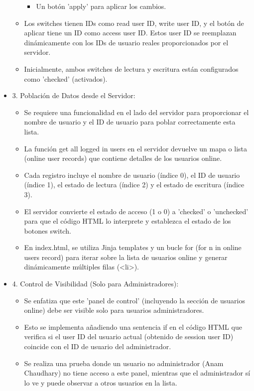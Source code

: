 \documentclass{report}
\begin{document}
\begin{itemize}
\begin{itemize}
\begin{itemize}
                    \item Un botón 'apply' para aplicar los cambios.
                \end{itemize}
            \item Los switches tienen IDs como read user ID, write user ID, y el botón de aplicar tiene un ID como access user ID. Estos user 
            ID se reemplazan dinámicamente con los IDs de usuario reales proporcionados por el servidor.
            \item Inicialmente, ambos switches de lectura y escritura están configurados como 'checked' (activados).
        \end{itemize}
    \item 3. Población de Datos desde el Servidor:
        \begin{itemize}
            \item Se requiere una funcionalidad en el lado del servidor para proporcionar el nombre de usuario y el ID de usuario para 
            poblar correctamente esta lista.
            \item La función get all logged in users en el servidor devuelve un mapa o lista (online user records) que contiene detalles 
            de los usuarios online.
            \item Cada registro incluye el nombre de usuario (índice 0), el ID de usuario (índice 1), el estado de lectura (índice 2) y 
            el estado de escritura (índice 3).
            \item El servidor convierte el estado de acceso (1 o 0) a 'checked' o 'unchecked' para que el código HTML lo interprete y 
            establezca el estado de los botones switch.
            \item En index.html, se utiliza Jinja templates y un bucle for (for n in online users record) para iterar sobre la lista de 
            usuarios online y generar dinámicamente múltiples filas (<li>).
        \end{itemize}
    \item 4. Control de Visibilidad (Solo para Administradores):
        \begin{itemize}
            \item Se enfatiza que este 'panel de control' (incluyendo la sección de usuarios online) debe ser visible solo 
            para usuarios administradores.
            \item Esto se implementa añadiendo una sentencia if en el código HTML que verifica si el user ID del usuario actual 
            (obtenido de session user ID) coincide con el ID de usuario del administrador.
            \item Se realiza una prueba donde un usuario no administrador (Anam Chaudhary) no tiene acceso a este panel, mientras que el 
            administrador sí lo ve y puede observar a otros usuarios en la lista.
        \end{itemize}
\end{itemize}
\end{document}
